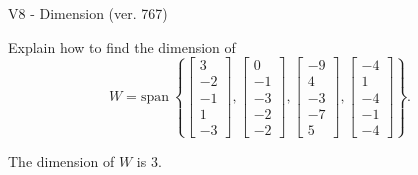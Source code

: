 \begin{exercise}
  \begin{exerciseTitle}V8 - Dimension (ver. 767)\end{exerciseTitle}
  \begin{exerciseStatement}
    Explain how to find the dimension of 
\[W=\mathrm{span}\ \left\{\left[\begin{array}{r}
3 \\
-2 \\
-1 \\
1 \\
-3
\end{array}\right] , \left[\begin{array}{r}
0 \\
-1 \\
-3 \\
-2 \\
-2
\end{array}\right] , \left[\begin{array}{r}
-9 \\
4 \\
-3 \\
-7 \\
5
\end{array}\right] , \left[\begin{array}{r}
-4 \\
1 \\
-4 \\
-1 \\
-4
\end{array}\right]\right\}.\]



  \end{exerciseStatement}
  \begin{exerciseAnswer}
   The dimension of \(W\) is  \(3\).
  


  \end{exerciseAnswer}
\end{exercise}